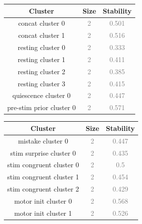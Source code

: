 \begin{table}[ht]
\centering
\begin{minipage}{0.32\textwidth}
\scriptsize
\setlength{\tabcolsep}{3pt}
\renewcommand{\arraystretch}{0.95}
\begin{tabular}{c|c|c}
\hline
\textbf{Cluster} & \textbf{Size} & \textbf{Stability} \\ \hline
concat cluster 0 & \textcolor{gray}{2} & \textcolor{gray}{0.501} \\ \hline
concat cluster 1 & \textcolor{gray}{2} & \textcolor{gray}{0.516} \\ \hline
resting cluster 0 & \textcolor{gray}{2} & \textcolor{gray}{0.333} \\ \hline
resting cluster 1 & \textcolor{gray}{2} & \textcolor{gray}{0.411} \\ \hline
resting cluster 2 & \textcolor{gray}{2} & \textcolor{gray}{0.385} \\ \hline
resting cluster 3 & \textcolor{gray}{2} & \textcolor{gray}{0.415} \\ \hline
quiescence cluster 0 & \textcolor{gray}{2} & \textcolor{gray}{0.447} \\ \hline
pre-stim prior cluster 0 & \textcolor{gray}{2} & \textcolor{gray}{0.571} \\ \hline
\end{tabular}
\end{minipage}
\hfill
\begin{minipage}{0.32\textwidth}
\scriptsize
\setlength{\tabcolsep}{3pt}
\renewcommand{\arraystretch}{0.95}
\begin{tabular}{c|c|c}
\hline
\textbf{Cluster} & \textbf{Size} & \textbf{Stability} \\ \hline
mistake cluster 0 & \textcolor{gray}{2} & \textcolor{gray}{0.447} \\ \hline
stim surprise cluster 0 & \textcolor{gray}{2} & \textcolor{gray}{0.435} \\ \hline
stim congruent cluster 0 & \textcolor{gray}{2} & \textcolor{gray}{0.5} \\ \hline
stim congruent cluster 1 & \textcolor{gray}{2} & \textcolor{gray}{0.454} \\ \hline
stim congruent cluster 2 & \textcolor{gray}{2} & \textcolor{gray}{0.429} \\ \hline
motor init cluster 0 & \textcolor{gray}{2} & \textcolor{gray}{0.568} \\ \hline
motor init cluster 1 & \textcolor{gray}{2} & \textcolor{gray}{0.526} \\ \hline

\end{tabular}
\end{minipage}
\end{table}
